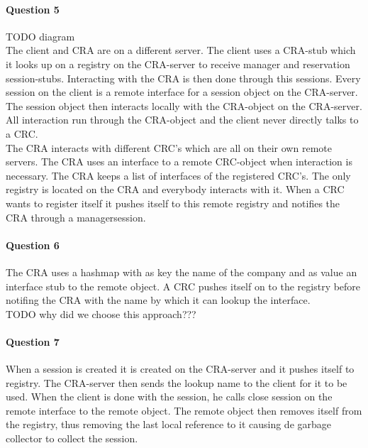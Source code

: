 \documentclass{ds-report}
\begin{document}
	\paragraph{Question 5} TODO diagram~\\
	
	
	The client and CRA are on a different server. The client uses a CRA-stub which it looks up on a registry on the CRA-server to receive manager and reservation session-stubs. Interacting with the CRA is then done through this sessions. Every session on the client is a remote interface for a session object on the CRA-server. The session object then interacts locally with the CRA-object on the CRA-server. \\
	
	All interaction run through the CRA-object and the client never directly talks to a CRC. \\
	
	The CRA interacts with different CRC's which are all on their own remote servers. The CRA uses an interface to a remote CRC-object when interaction is necessary. The CRA keeps a list of interfaces of the registered CRC's. The only registry is located on the CRA and everybody interacts with it. When a CRC wants to register itself it pushes itself to this remote registry and notifies the CRA through a managersession. 
	
	\paragraph{Question 6} 
	The CRA uses a hashmap with as key the name of the company and as value an interface stub to the remote object. A CRC pushes itself on to the registry before notifing the CRA with the name by which it can lookup the interface.\\
	
	TODO why did we choose this approach???
	
	\paragraph{Question 7} 
	When a session is created it is created on the CRA-server and it pushes itself to registry. The CRA-server then sends the lookup name to the client for it to be used. When the client is done with the session, he calls close session on the remote interface to the remote object. The remote object then removes itself from the registry, thus removing the last local reference to it causing de garbage collector to collect the session. \\
	
\end{document}
